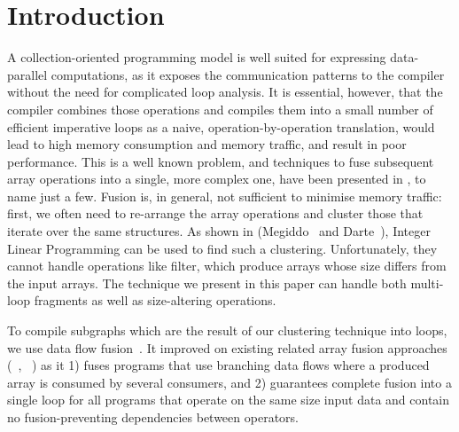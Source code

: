 \section{Introduction}
\label{s:Introduction}
A collection-oriented programming model is well suited for expressing data-parallel computations, as it exposes the communication patterns to the compiler without the need for complicated loop analysis.  It is essential, however, that the compiler combines those operations and compiles them into a small number of efficient imperative loops as a naive, operation-by-operation translation, would lead to high memory consumption and memory traffic, and result in poor performance. This is a well known problem, and techniques to fuse subsequent array operations into a single, more complex one, have been presented in \cite{coutts2007streamfusion, gao1993collective, kennedy1993typedfusion, kennedy2001fastgreedy, keller2010repa}, to name just a few. Fusion is, in general, not sufficient to minimise memory traffic: first, we often need to re-arrange the array operations and cluster those that iterate over the same structures. As shown in (Megiddo~\cite{megiddo1998optimal} and Darte~\cite{darte2002contraction}), Integer Linear Programming can be used to find such a clustering. Unfortunately, they cannot handle operations like filter, which produce arrays whose size differs from the input arrays.  The technique we present in this paper can handle both multi-loop fragments as well as size-altering operations. 

To compile subgraphs which are the result of our clustering technique into loops, we use data flow fusion~\cite{lippmeier2013flow}. It improved on existing related array fusion approaches (~\cite{coutts2007streamfusion}, ~\cite{keller2010repa}) as it 1) fuses programs that use branching data flows where a produced array is consumed by several consumers, and 2) guarantees complete fusion into a single loop for all programs that operate on the same size input data and contain no fusion-preventing dependencies between operators. 


